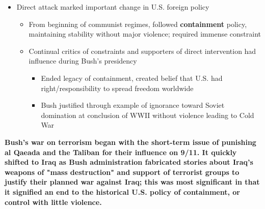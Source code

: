\documentclass[a4paper]{article}
\begin{document}
{\begin{itemize}
\begin{itemize}
                \item Direct attack marked important change in U.S. foreign policy
                \begin{itemize}
                    \item From beginning of communist regimes, followed \textbf{containment} policy, maintaining stability without major violence; required immense constraint
                    \item Continual critics of constraints and supporters of direct intervention had influence during Bush's presidency
                    \begin{itemize}
                        \item Ended legacy of containment, created belief that U.S. had right/responsibility to spread freedom worldwide
                        \item Bush justified through example of ignorance toward Soviet domination at conclusion of WWII without violence leading to Cold War
                    \end{itemize}
                \end{itemize}
            \end{itemize}
        \end{itemize}
        \textbf{Bush's war on terrorism began with the short-term issue of punishing al Qaeada and the Taliban for their influence on 9/11. It quickly shifted to Iraq as Bush administration fabricated stories about Iraq's weapons of "mass destruction" and support of terrorist groups to justify their planned war against Iraq; this was most significant in that it signified an end to the historical U.S. policy of containment, or control with little violence.}
    }
\end{document}
